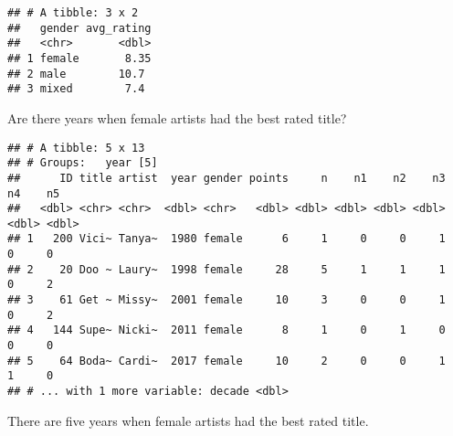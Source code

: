 \documentclass[
]{article}
\newenvironment{Shaded}{\begin{snugshade}}{\end{snugshade}}
\newcommand{\DecValTok}[1]{\textcolor[rgb]{0.00,0.00,0.81}{#1}}
\newcommand{\KeywordTok}[1]{\textcolor[rgb]{0.13,0.29,0.53}{\textbf{#1}}}
\newcommand{\NormalTok}[1]{#1}
\newcommand{\OperatorTok}[1]{\textcolor[rgb]{0.81,0.36,0.00}{\textbf{#1}}}
\newcommand{\StringTok}[1]{\textcolor[rgb]{0.31,0.60,0.02}{#1}}
\begin{document}
\begin{verbatim}
## # A tibble: 3 x 2
##   gender avg_rating
##   <chr>       <dbl>
## 1 female       8.35
## 2 male        10.7 
## 3 mixed        7.4
\end{verbatim}

Are there years when female artists had the best rated title?

\begin{Shaded}
\end{Shaded}

\begin{verbatim}
## # A tibble: 5 x 13
## # Groups:   year [5]
##      ID title artist  year gender points     n    n1    n2    n3    n4    n5
##   <dbl> <chr> <chr>  <dbl> <chr>   <dbl> <dbl> <dbl> <dbl> <dbl> <dbl> <dbl>
## 1   200 Vici~ Tanya~  1980 female      6     1     0     0     1     0     0
## 2    20 Doo ~ Laury~  1998 female     28     5     1     1     1     0     2
## 3    61 Get ~ Missy~  2001 female     10     3     0     0     1     0     2
## 4   144 Supe~ Nicki~  2011 female      8     1     0     1     0     0     0
## 5    64 Boda~ Cardi~  2017 female     10     2     0     0     1     1     0
## # ... with 1 more variable: decade <dbl>
\end{verbatim}

There are five years when female artists had the best rated title.

\begin{Shaded}
\end{Shaded}
\end{document}
